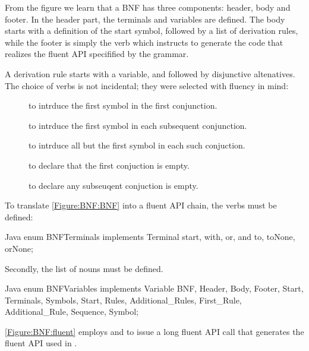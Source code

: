 From the figure we learn that a BNF has three components: header, body and footer.
In the header part, the terminals and variables are defined.
The body starts with a definition of the start symbol, followed by a list of derivation 
  rules, while the footer is simply the verb  which instructs \SELF
  to generate the code that realizes the fluent API specifified by the grammar.

A derivation rule starts with a variable, and followed by disjunctive altenatives.
The choice of verbs is not incidental; they were
selected with fluency in mind:
\begin{description}
  \item[] to intrduce the first symbol in the first conjunction.
  \item[] to intrduce the first symbol in each subsequent conjunction.
  \item[] to intrduce all but the first symbol in each such conjuction.
  \item[] to declare that the first conjuction is empty.
  \item[] to declare any subseuqent conjuction is empty.
\end{description}

To translate \cref{Figure:BNF:BNF} into a fluent 
  API chain, the verbs must be defined:
\begin{code}{Java}
enum BNFTerminals implements Terminal {
  start, with, or, and
  to, toNone, orNone;
}
\end{code}

Secondly, the list of nouns must be defined.
\begin{code}{Java}
enum BNFVariables implements Variable {
  BNF, Header, Body, Footer,
  Start, Terminals, Symbols,
  Start, Rules, Additional_Rules,
  First_Rule, Additional_Rule,
  Sequence, Symbol;
}
\end{code}

\cref{Figure:BNF:fluent} employs   and 
    to issue a long fluent API
  call that generates the fluent API used in \SELF. 

